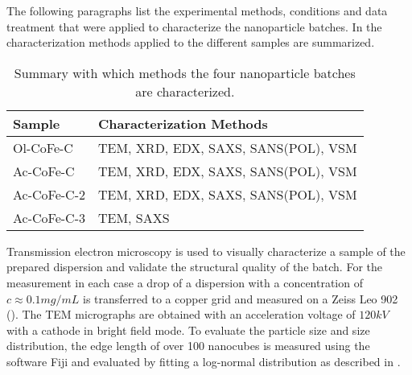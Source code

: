 \documentclass[\main/dresen_thesis.tex]{subfiles}
\begin{document}
  \label{sec:monolayers:nanoparticle:structuralCharacterization}
  The following paragraphs list the experimental methods, conditions and data treatment that were applied to characterize the nanoparticle batches.
  In  the characterization methods applied to the different samples are summarized.

  \begin{table}[!htbp]
    \centering
    \caption{\label{tab:monolayers:nanoparticles:charMethod:overview}Summary with which methods the four nanoparticle batches are characterized.}
    \begin{tabular}{ l | l }
      \textbf{Sample} & \textbf{Characterization Methods}\\
      \hline
      Ol-CoFe-C   & TEM, XRD, EDX, SAXS, SANS(POL), VSM \\
      Ac-CoFe-C   & TEM, XRD, EDX, SAXS, SANS(POL), VSM \\
      Ac-CoFe-C-2 & TEM, XRD, EDX, SAXS, SANS(POL), VSM \\
      Ac-CoFe-C-3 & TEM, SAXS \\
      \hline
    \end{tabular}
  \end{table}

    Transmission electron microscopy is used to visually characterize a sample of the prepared dispersion and validate the structural quality of the batch.
    For the measurement in each case a drop of a dispersion with a concentration of $c \approx 0.1 \unit{mg/mL}$ is transferred to a copper grid and measured on a Zeiss Leo 902 ().
    The TEM micrographs are obtained with an acceleration voltage of $120 \unit{kV}$ with a  cathode in bright field mode.
    To evaluate the particle size and size distribution, the edge length of over 100 nanocubes is measured using the software Fiji \cite{Schindelin_2012_Fijia} and evaluated by fitting a log-normal distribution as described in .
\end{document}
